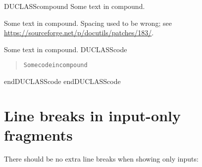\documentclass[a4paper]{article}
\newenvironment{DUclass}[1]%
  {%
   \def\DocutilsClassFunctionName{DUCLASS#1}
     \csname \DocutilsClassFunctionName \endcsname}%
  {\csname end\DocutilsClassFunctionName \endcsname}%
\begin{document}
\begin{DUclass}{compound}
Some text in compound.

Some text in compound.  Spacing used to be wrong; see \url{https://sourceforge.net/p/docutils/patches/183/}.
\begin{alectryon}
  \begin{\al{txt}}
  \end{\al{txt}}
\end{alectryon}
\begin{alectryon}
  \begin{\al{txt}}
  \end{\al{txt}}
\end{alectryon}
Some text in compound.
\begin{DUclass}{code}
\begin{quote}
\begin{alltt}
Some code in compound
\end{alltt}
\end{quote}
\end{DUclass}
\end{DUclass}


\section{Line breaks in input-only fragments%
  \label{line-breaks-in-input-only-fragments}%
}

There should be no extra line breaks when showing only inputs:
\end{document}

